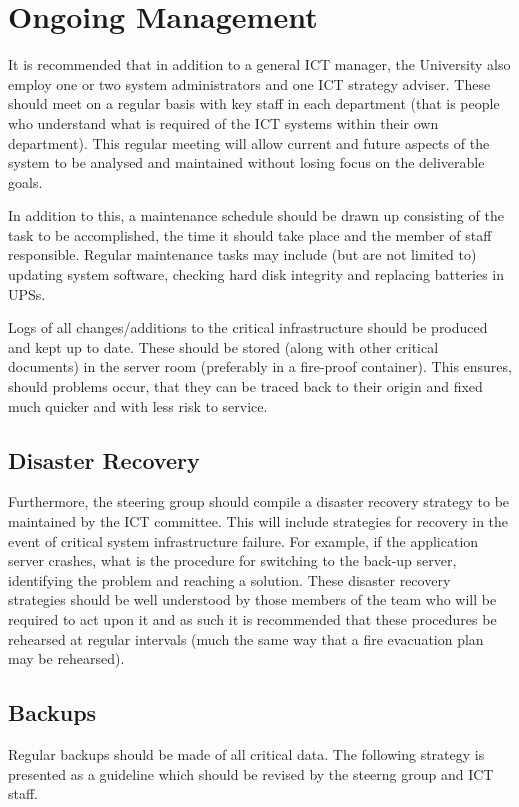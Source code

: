 \documentclass[a4paper, twoside]{article}
\begin{document}
\section{Ongoing Management}
\label{sec:manage}
It is recommended that in addition to a general ICT manager, the University also
employ one or two system administrators and one ICT strategy adviser. These
should meet on a regular basis with key staff in each department (that is people
who understand what is required of the ICT systems within their own department).
This regular meeting will allow current and future aspects of the system to be
analysed and maintained without losing focus on the deliverable goals.

In addition to this, a maintenance schedule should be drawn up consisting of the
task to be accomplished, the time it should take place and the member of staff
responsible. Regular maintenance tasks may include (but are not limited to)
updating system software, checking hard disk integrity and replacing batteries
in UPSs.

Logs of all changes/additions to the critical infrastructure should be produced
and kept up to date. These should be stored (along with other critical
documents) in the server room (preferably in a fire-proof container). This
ensures, should problems occur, that they can be traced back to their origin and
fixed much quicker and with less risk to service.

\subsection{Disaster Recovery}
Furthermore, the steering group should compile a disaster recovery strategy to
be maintained by the ICT committee. This will include strategies for recovery in
the event of critical system infrastructure failure. For example, if the
application server crashes, what is the procedure for switching to the back-up
server, identifying the problem and reaching a solution. These disaster recovery
strategies should be well understood by those members of the team who will be
required to act upon it and as such it is recommended that these procedures be
rehearsed at regular intervals (much the same way that a fire evacuation plan
may be rehearsed).

\subsection{Backups}
Regular backups should be made of all critical data. The following strategy is
presented as a guideline which should be revised by the steerng group and ICT
staff.
\end{document}
